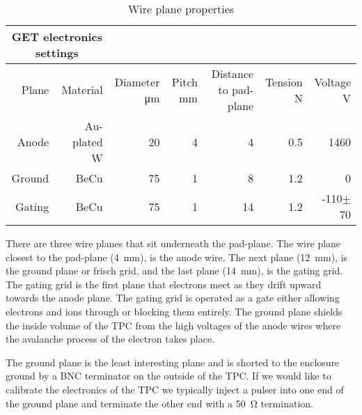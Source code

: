  \begin{table*}\centering
{}
\begin{tabular}{@{}rrrrrrr@{}}\toprule 
\multicolumn{2}{c}{GET electronics settings}\\
\midrule
 Plane & Material & Diameter \si{\micro\metre} & Pitch \si{\milli\metre} & Distance to pad-plane & Tension \si{\newton} & Voltage \si{\volt}\\ [0.5ex] 
 Anode  & Au-plated W   &  20  &  4  &  4   &  0.5  &  1460  \\
 Ground & BeCu          &  75  &  1  &  8   &  1.2  &  0     \\ 
 Gating & BeCu          &  75  &  1  &  14   &  1.2 &  -110$\pm$ 70\\ 
 \bottomrule
\end{tabular}
\caption{Wire plane properties}
\label{tb:wireplane}
\end{table*}


There are three wire planes that sit underneath the pad-plane. The wire plane closest to the pad-plane (\SI{4}{\milli\metre}), is the anode wire. The next plane (\SI{12}{\milli\metre}), is the ground plane or frisch grid, and the last plane (\SI{14}{\milli\metre}), is the gating grid. The gating grid is the first plane that electrons meet as they drift upward towards the anode plane. The gating grid is operated as a gate either allowing electrons and ions through or blocking them entirely. The ground plane shields the inside volume of the TPC from the high voltages of the anode wires where the avalanche process of the electron takes place. 

The ground plane is the least interesting plane and is shorted to the enclosure ground by a BNC terminator on the outside of the TPC. If we would like to calibrate the electronics of the TPC we typically inject a pulser into one end of the ground plane and terminate the other end with a \SI{50}{\ohm} termination. 

